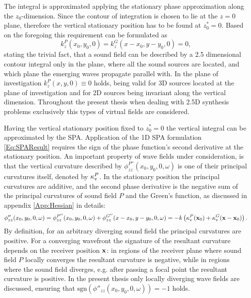 The integral is approximated applying the stationary phase approximation along the $z_0$-dimension.
Since the contour of integration is chosen to lie at the $z=0$ plane, therefore the vertical stationary position has to be found at $z_0^* = 0$.
Based on the foregoing this requirement can be formulated as
\begin{equation}
k_z^P(x_0,y_0,0) = k_z^G(x-x_0,y-y_0,0) = 0,
\end{equation}
stating the trivial fact, that a sound field can be described by a 2.5 dimensional contour integral only in the plane, where all the sound sources are located, and which plane the emerging waves propagate parallel with.
In the plane of investigation $k_z^P(x,y,0) \equiv 0$ holds, being valid for 3D sources located at the plane of investigation and for 2D sources being invariant along the vertical dimension.
Throughout the present thesis when dealing with 2.5D synthesis problems exclusively this types of virtual fields are considered.

Having the vertical stationary position fixed to $z_0^* = 0$ the vertical integral can be approximated by the SPA.
Application of the 1D SPA formulation \eqref{Eq:SPAResult} requires the sign of the phase function's second derivative at the stationary position. 
An important property of wave fields under consideration, is that the vertical curvature described by $\phi^{P''}_{zz}(x_0,y_0,0,\omega)$ is one of their principal curvatures itself, denoted by $\kappa_\mathrm{v}^P$.
In the stationary position the principal curvatures are additive, and the second phase derivative is the negative sum of the principal curvatures of sound field $P$ and the Green's function, as discussed in appendix \ref{App:Hessian} in details:
\begin{equation}
\small
\phi''_{zz}(x_0,y_0,0,\omega) = \phi^{P''}_{zz}(x_0,y_0,0,\omega) +\phi^{G''}_{zz}(x-x_0,y-y_0,0,\omega) = -k\left( \kappa_\mathrm{v}^P(\mathbf{x}_0) + \kappa_\mathrm{v}^G(\mathbf{x}-\mathbf{x}_0) \right).
\label{Eq:SFS_theory:Curvatures_Addition}
\end{equation}
By definition, for an arbitrary diverging sound field the principal curvatures are positive.
For a converging wavefront the signature of the resultant curvature depends on the receiver position $\mathbf{x}$: in regions of the receiver plane where sound field $P$ locally converges the resultant curvature is negative, while in regions where the sound field diverges, e.g. after passing a focal point the resultant curvature is positive.
In the present thesis only locally diverging wave fields are discussed, ensuring that $\mathrm{sgn} \left( \phi''_{zz}(x_0,y_0,0,\omega) \right) = -1$ holds.


